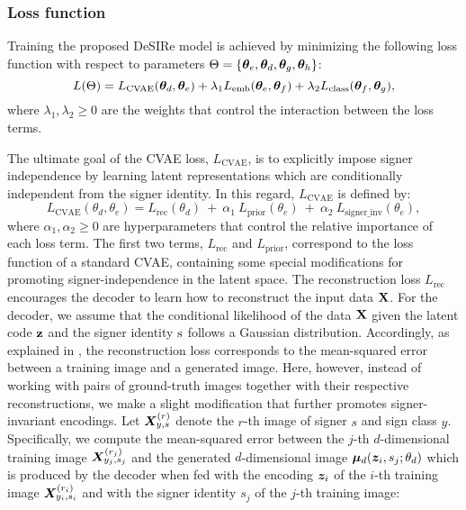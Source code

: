 \subsubsection{Loss function}
\label{sec:loss}
Training the proposed DeSIRe model is achieved by minimizing the following loss function with respect to parameters $\Theta=\{{\bm{\theta}}_{e},{\bm{\theta}}_{d},{\bm{\theta}}_{g},{\bm{\theta}}_{h}\}$:
\begin{equation}
    L(\Theta) = L_{\text{CVAE}}({\bm{\theta}}_{d},{\bm{\theta}}_{e}) + \lambda_{1} L_{\text{emb}}({\bm{\theta}}_{e},{\bm{\theta}}_{f}) + \lambda_{2} L_{\text{class}}({\bm{\theta}}_{f},{\bm{\theta}}_{g}),
\end{equation}
where $\lambda_{1},\lambda_{2}\geq 0$ are the weights that control the interaction between the loss terms.

The ultimate goal of the CVAE loss, $L_{\text{CVAE}}$, is to explicitly impose signer independence by learning latent representations which are conditionally independent from the signer identity. In this regard, $L_{\text{CVAE}}$ is defined by:
\begin{equation}
    L_{\text{CVAE}}(\theta_{d},\theta_{e}) = L_{\text{rec}}(\theta_{d})~+~\alpha_{1}~L_{\text{prior}}(\theta_{e})~+~\alpha_{2}~L_{\text{signer\_inv}}(\theta_{e}),
\end{equation}
where $\alpha_{1},\alpha_{2}\geq 0$ are hyperparameters that control the relative importance of each loss term. The first two terms, $L_{\text{rec}}$ and $L_{\text{prior}}$, correspond to the loss function of a standard CVAE, containing some special modifications for promoting signer-independence in the latent space. The reconstruction loss $L_{\text{rec}}$ encourages the decoder to learn how to reconstruct the input data ${\mathbf{X}}$. For the decoder, we assume that the conditional likelihood of the data ${\mathbf{X}}$ given the latent code ${\mathbf{z}}$ and the signer identity ${\textnormal{s}}$ follows a Gaussian distribution. Accordingly, as explained in , the reconstruction loss corresponds to the mean-squared error between a training image and a generated image. Here, however, instead of working with pairs of ground-truth images together with their respective reconstructions, we make a slight modification that further promotes signer-invariant encodings. Let ${\bm{X}}^{(r)}_{y,s}$ denote the $r$-th image of signer $s$ and sign class $y$. Specifically, we compute the mean-squared error between the $j$-th $d$-dimensional training image ${\bm{X}}^{(r_{j})}_{y_{j},s_{j}}$ and the generated $d$-dimensional image ${\bm{\mu}}_d({\bm{z}}_{i},s_{j}; \theta_{d})$ which is produced by the decoder when fed with the encoding ${\bm{z}}_{i}$ of the $i$-th training image ${\bm{X}}^{(r_{i})}_{y_{i},s_{i}}$ and with the signer identity $s_j$ of the $j$-th training image:
